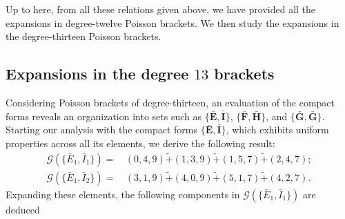 \documentclass[10pt]{amsart}
\theoremstyle{definition}
\theoremstyle{corollary}
\theoremstyle{remark}
\theoremstyle{conclusion}
\begin{document}
Up to here, from all these relations given above, we have provided all the expansions in degree-twelve Poisson brackets. We then study the expansions in the degree-thirteen Poisson brackets.

\vskip 0.5cm

\subsection{Expansions in the degree $13$ brackets}

  Considering Poisson brackets of degree-thirteen, an evaluation of the compact forms reveals an organization into sets such as $\{\bar{\textbf{E}},\bar{\textbf{I}}\}$, $\{\bar{\textbf{F}},\bar{\textbf{H}}\}$, and $\{\bar{\textbf{G}},\bar{\textbf{G}}\}$. Starting our analysis with the compact forms $\{\bar{\textbf{E}},\bar{\textbf{I}}\}$, which exhibits uniform properties across all its elements, we derive the following result:
\begin{align}
    \mathcal{G}\left(\{\bar{E}_1,\bar{I}_1\}\right) = & \, (0,4,9) \tilde{+} (1,3,9) \tilde{+} (1,5,7) \tilde{+}(2,4,7); \nonumber \\
     \mathcal{G}\left(\{\bar{E}_1,\bar{I}_2\}\right) = & \, (3,1,9) \tilde{+} (4,0,9) \tilde{+} (5,1,7) \tilde{+}(4,2,7).
\end{align} 
  Expanding these elements, the following components in $ \mathcal{G}\left(\{\bar{E}_1,\bar{I}_1\}\right) $ are deduced 
\end{document}
